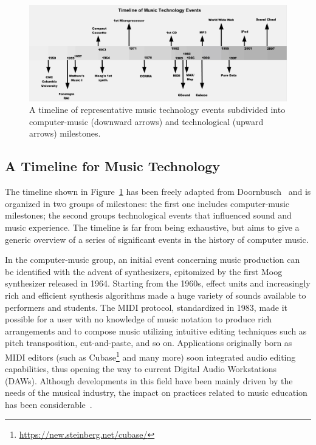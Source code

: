 \documentclass[10pt,journal,compsoc]{IEEEtran}
\begin{document}
\begin{figure}[t]
	\includegraphics[width=\textwidth]{images/timeline1.jpg}
	\caption{A timeline of representative music technology events subdivided into computer-music (downward arrows) and technological (upward arrows) milestones.}
	\label{fig:MTT}       
\end{figure}

\subsection{A Timeline for Music Technology}
\label{subsec:TL}

The timeline shown in Figure~\ref{fig:MTT} has been freely adapted from Doornbusch~\cite{keislar2009historical} and is organized in two groups of milestones: the first one includes computer-music milestones; the second groups technological events that influenced sound and music experience. The timeline is far from being exhaustive, but aims to give a generic overview of a series of significant events in the history of computer music.

In the computer-music group, an initial event concerning music production can be identified with the advent of synthesizers, epitomized by the first Moog synthesizer released in 1964. Starting from the 1960s, effect units and increasingly rich and efficient synthesis algorithms made a huge variety of sounds available to performers and students. The MIDI protocol, standardized in 1983, made it possible for a user with no knowledge of music notation to produce rich arrangements and to compose music utilizing intuitive editing techniques such as pitch transposition, cut-and-paste, and so on. Applications originally born as MIDI editors (such as Cubase\footnote{\url{https://new.steinberg.net/cubase/}} and many more) soon integrated audio editing capabilities, thus opening the way to current Digital Audio Workstations (DAWs). Although developments in this field have been mainly driven by the needs of the musical industry, the impact on practices related to music education has been considerable~\cite{webster2012computers}.
\end{document}

